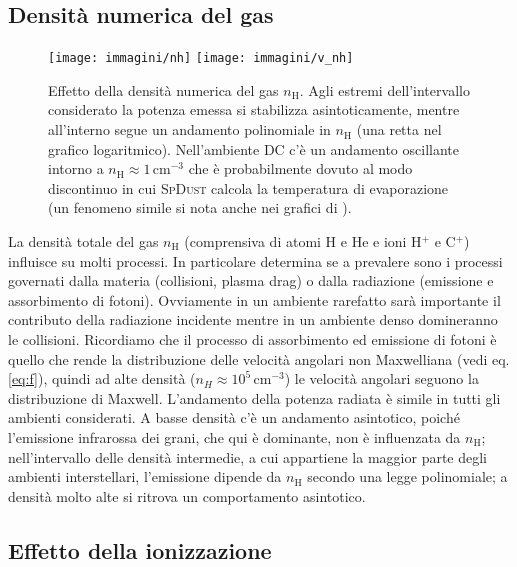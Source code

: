\subsection{Densità numerica del gas}
\begin{figure}

	\centerline{
		\centering
		\subfigure
		{\texttt{[image: immagini/nh]}}
		\hspace{-5mm}
		\subfigure
		{\texttt{[image: immagini/v\_nh]}}
	}
	\caption{Effetto della densità numerica del gas $n_\mathrm{H}$. Agli estremi dell'intervallo considerato la potenza emessa si stabilizza asintoticamente, mentre all'interno segue un andamento polinomiale in $n_\mathrm{H}$ (una retta nel grafico logaritmico). Nell'ambiente DC c'è un andamento oscillante intorno a $n_\mathrm{H}\approx1$\,cm$^{-3}$ che è probabilmente dovuto al modo discontinuo in cui \textsc{SpDust} calcola la temperatura di evaporazione (un fenomeno simile si nota anche nei grafici di \textcite{Ali}).}
		\label{plotnh}
\end{figure}

La densità totale del gas $n_\mathrm{H}$ (comprensiva di atomi H e He e ioni H$^+$ e C$^+$) influisce su molti processi. In particolare determina se a prevalere sono i processi governati dalla materia (collisioni, plasma drag) o dalla radiazione (emissione e assorbimento di fotoni). Ovviamente in un ambiente rarefatto sarà importante il contributo della radiazione incidente mentre in un ambiente denso domineranno le collisioni. Ricordiamo che il processo di assorbimento ed emissione di fotoni è quello che rende la distribuzione delle velocità angolari non Maxwelliana (vedi eq. \ref{eq:f}), quindi ad alte densità ($n_H\approx10^5$\,cm$^{-3}$) le velocità angolari seguono la distribuzione di Maxwell.
L'andamento della potenza radiata è simile in tutti gli ambienti considerati. A basse densità c'è un andamento asintotico, poiché l'emissione infrarossa dei grani, che qui è dominante, non è influenzata da $n_\mathrm{H}$; nell'intervallo delle densità intermedie, a cui appartiene la maggior parte degli ambienti interstellari, l'emissione dipende da $n_\mathrm{H}$ secondo una legge polinomiale; a densità molto alte si ritrova un comportamento asintotico.

\subsection{Effetto della ionizzazione}
\label{ioni}

